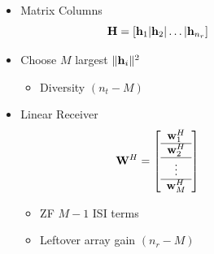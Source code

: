 \documentclass[xcolor=dvipsnames,aspectratio=169]{beamer}
\begin{document}
{\begin{columns}
\begin{column}{6.5cm}
 \end{column}
 \begin{column}{6cm}    
\begin{itemize}
\item Matrix Columns
    $$\mathbf{H}=\left[\mathbf{h}_1|\mathbf{h}_2|\dots|\mathbf{h}_{n_r}\right]$$
\item Choose $M$ largest $\|\mathbf{h}_i\|^2$
\begin{itemize}
    \item Diversity $(n_t-M)$
\end{itemize}
\item Linear Receiver
    $$\mathbf{W}^H=\left[\begin{array}{c}\mathbf{w}_1^H\\\hline\mathbf{w}_2^H\\\hline\vdots\\\hline \mathbf{w}_{M}^H\end{array}\right]$$
    \vspace{-.1in}
    \begin{itemize}
     \item ZF $M-1$ ISI terms
     \item Leftover array gain $(n_r-M)$
    \end{itemize}
\end{itemize}
 \end{column}
\end{columns}
}
\end{document}
